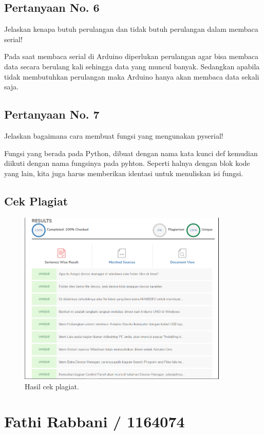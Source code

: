 \subsection{Pertanyaan No. 6}
Jelaskan kenapa butuh perulangan dan tidak butuh perulangan dalam membaca serial!

\hfill \break
Pada saat membaca serial di Arduino diperlukan perulangan agar bisa membaca data secara berulang kali sehingga data yang muncul banyak. Sedangkan apabila tidak membutuhkan perulangan maka Arduino hanya akan membaca data sekali saja.

\subsection{Pertanyaan No. 7}
Jelaskan bagaimana cara membuat fungsi yang mengunakan pyserial!

\hfill \break
Fungsi yang berada pada Python, dibuat dengan nama kata kunci def kemudian diikuti dengan nama fungsinya pada pyhton.
Seperti halnya dengan blok kode yang lain, kita juga harus memberikan identasi untuk menuliskan isi fungsi.

\subsection{Cek Plagiat}
\begin{figure}[H]
	\includegraphics[width=10cm]{figures/chapter5/1174063/plagiatgabe}
	\centering
	\caption{Hasil cek plagiat.}
\end{figure}

\section{Fathi Rabbani / 1164074}
